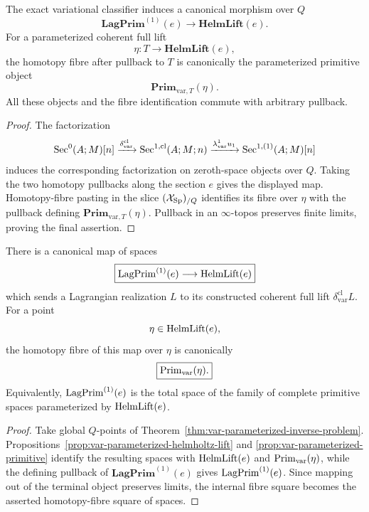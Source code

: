 \begin{theorem}
\label{thm:var-parameterized-inverse-problem}
The exact variational classifier induces a canonical morphism over \(Q\)
\[
    \boxed{
    \mathbf{LagPrim}^{(1)}(e)
    \longrightarrow
    \mathbf{HelmLift}(e).
    }
\]
For a parameterized coherent full lift
\[
    \eta:T\longrightarrow\mathbf{HelmLift}(e),
\]
the homotopy fibre after pullback to \(T\) is canonically the parameterized primitive object
\[
    \boxed{
    \mathbf{Prim}_{\mathrm{var},T}(\eta).
    }
\]
All these objects and the fibre identification commute with arbitrary pullback.
\end{theorem}

\begin{proof}
The factorization
\[
    \operatorname{Sec}^0(A;M)[n]
    \xrightarrow{\delta^{\mathrm{cl}}_{\mathrm{var}}}
    \operatorname{Sec}^{1,\mathrm{cl}}(A;M;n)
    \xrightarrow{\lambda^1_{\mathrm{var}}u_1}
    \operatorname{Sec}^{1,(1)}(A;M)[n]
\]
induces the corresponding factorization on zeroth-space objects over \(Q\). Taking the two homotopy pullbacks along the section \(e\) gives the displayed map. Homotopy-fibre pasting in the slice \((\mathcal{X}_{\mathrm{Sp}})_{/Q}\) identifies its fibre over \(\eta\) with the pullback defining \(\mathbf{Prim}_{\mathrm{var},T}(\eta)\). Pullback in an \(\infty\)-topos preserves finite limits, proving the final assertion.
\end{proof}

\begin{theorem}
\label{thm:var-inverse-problem}
There is a canonical map of spaces
\[
    \boxed{
    \operatorname{LagPrim}^{(1)}(e)
    \longrightarrow
    \operatorname{HelmLift}(e)
    }
\]
which sends a Lagrangian realization \(L\) to its constructed coherent full lift \(\delta^{\mathrm{cl}}_{\mathrm{var}}L\). For a point
\[
    \eta\in\operatorname{HelmLift}(e),
\]
the homotopy fibre of this map over \(\eta\) is canonically
\[
    \boxed{
    \operatorname{Prim}_{\mathrm{var}}(\eta).
    }
\]
Equivalently, \(\operatorname{LagPrim}^{(1)}(e)\) is the total space of the family of complete primitive spaces parameterized by \(\operatorname{HelmLift}(e)\).
\end{theorem}

\begin{proof}
Take global \(Q\)-points of Theorem~\ref{thm:var-parameterized-inverse-problem}. Propositions~\ref{prop:var-parameterized-helmholtz-lift} and \ref{prop:var-parameterized-primitive} identify the resulting spaces with \(\operatorname{HelmLift}(e)\) and \(\operatorname{Prim}_{\mathrm{var}}(\eta)\), while the defining pullback of \(\mathbf{LagPrim}^{(1)}(e)\) gives \(\operatorname{LagPrim}^{(1)}(e)\). Since mapping out of the terminal object preserves limits, the internal fibre square becomes the asserted homotopy-fibre square of spaces.
\end{proof}

